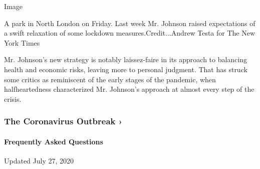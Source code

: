 Image

A park in North London on Friday. Last week Mr. Johnson raised
expectations of a swift relaxation of some lockdown
measures.Credit...Andrew Testa for The New York Times

Mr. Johnson's new strategy is notably laissez-faire in its approach to
balancing health and economic risks, leaving more to personal judgment.
That has struck some critics as reminiscent of the early stages of the
pandemic, when halfheartedness characterized Mr. Johnson's approach at
almost every step of the crisis.

\href{https://www.nytimes.com/news-event/coronavirus?action=click\&pgtype=Article\&state=default\&region=MAIN_CONTENT_3\&context=storylines_faq}{}

\hypertarget{the-coronavirus-outbreak-}{%
\subsubsection{The Coronavirus Outbreak
›}\label{the-coronavirus-outbreak-}}

\hypertarget{frequently-asked-questions}{%
\paragraph{Frequently Asked
Questions}\label{frequently-asked-questions}}

Updated July 27, 2020


